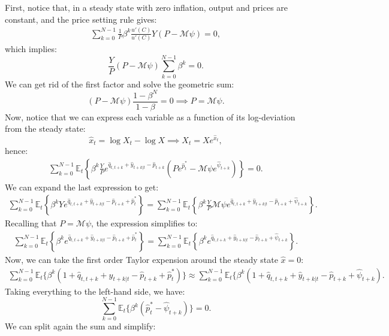 \documentclass[dvipsnames,11pt]{article}
\begin{document}
\begin{enumerate}
            \begin{solution}
First, notice that, in a steady state with zero inflation, output and prices are constant, and the price setting rule gives:
\begin{align*}
    \sum_{k=0}^{N-1} \frac{1}{P} \beta^k \frac{u'(C)}{u'(C)} Y (P- \mathcal{M} \psi) =0,
\end{align*}
which implies:
\[
\frac{Y}{P}(P-\mathcal{M}\psi) \sum_{k=0}^{N-1}\beta ^k=0.
\]
We can get rid of the first factor and solve the geometric sum:
\[
(P-\mathcal{M}\psi) \frac{1-\beta^{N}}{1-\beta}=0 \implies P=\mathcal{M}\psi.
\]
Now, notice that we can express each variable as a function of its log-deviation from the steady state:
\[
\hat x_t= \log X_t - \log X \implies X_t=Xe^{\hat x_t},
\]
hence:
\begin{align*}
    \sum_{k=0}^{N-1} \mathbb{E}_t \left \{ \beta ^k \frac{Y}{P} e^{\hat q_{t,t+k}+\hat y_{t+k|t}-\hat p_{t+k}}(Pe^{\hat p_t^*}-\mathcal{M}\psi e^{\hat \psi _{t+k}})\right \}=0.
\end{align*}
We can expand the last expression to get:
\begin{align*}
    \sum_{k=0}^{N-1} \mathbb{E}_t \left \{ \beta ^k Y e^{\hat q_{t,t+k}+\hat y_{t+k|t}-\hat p_{t+k}+\hat p_t^*} \right \} = \sum_{k=0}^{N-1} \mathbb{E}_t \left \{ \beta^k \frac{Y}{P}\mathcal{M}\psi e^{\hat q_{t,t+k}+\hat y_{t+k|t}-\hat p_{t+k}+\hat \psi_{t+k}}  \right\}.
\end{align*}
Recalling that $P=\mathcal{M}\psi$, the expression simplifies to:
\begin{align*}
    \sum_{k=0}^{N-1} \mathbb{E}_t \left \{ \beta ^k e^{\hat q_{t,t+k}+\hat y_{t+k|t}-\hat p_{t+k}+\hat p_t^*} \right \} = \sum_{k=0}^{N-1} \mathbb{E}_t \left \{ \beta^k e^{\hat q_{t,t+k}+\hat y_{t+k|t}-\hat p_{t+k}+\hat \psi_{t+k}}  \right\}.
\end{align*}
              Now, we can take the first order Taylor expension around the steady state $\hat x=0$:
              \begin{align*}
                  \sum_{k=0}^{N-1} \mathbb{E}_t \{ \beta^k(1+\hat q_{t,t+k}+\hat y_{t+k|t}-\hat p_{t+k}+\hat p_t^*)\} \approx \sum_{k=0}^{N-1}\mathbb{E}_t \{ \beta^k (1+\hat q_{t,t+k}+\hat y_{t+k|t}-\hat p_{t+k}+\hat \psi_{t+k}).
              \end{align*}
Taking everything to the left-hand side, we have:
\[
\sum_{k=0}^{N-1} \mathbb{E}_t \{ \beta^k(\hat p_t^*-\hat \psi_{t+k}) \} =0.
\]
We can split again the sum and simplify:
\begin{align*}

\end{align*}
\end{solution}
\end{enumerate}
\end{document}
